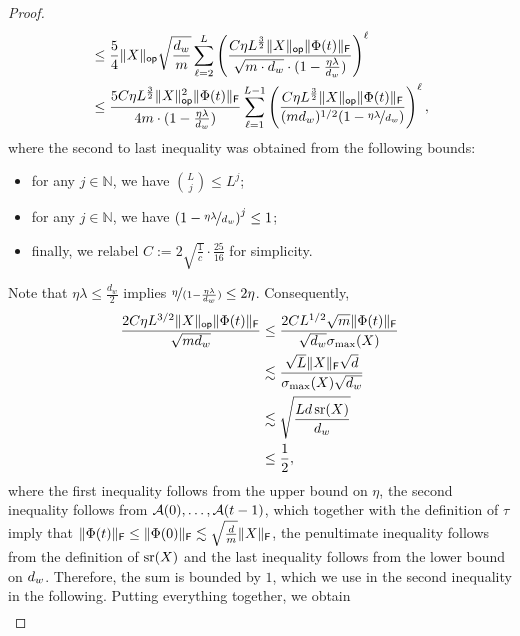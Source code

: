 \begin{proof}
\begin{align*}
                 &\leq
 \frac{5}{4} \lVert X\rVert_{\mathsf{op}}  \sqrt{\frac{d_{w}}{m}}
  \sum_{\ell=2}^{L} \left(\frac{C \eta L^{\frac{3}{2}} \lVert X\rVert_{\mathsf{op}} \lVert\Phi(t)\rVert_{\mathsf{F}}}{\sqrt{m \cdot d_w} \cdot (1 - \frac{\eta \lambda}{d_w})}\right)^{\ell} \\
                 &\leq
                 \frac{5C \eta L^{\frac{3}{2}} \lVert X\rVert_{\mathsf{op}}^2 \lVert\Phi(t)\rVert_{\mathsf{F}}}{4m \cdot (1 - \frac{\eta \lambda}{d_w})}
                 \sum_{\ell = 1}^{L - 1} \left(
                   \frac{C \eta L^{\frac{3}{2}} \lVert X\rVert_{\mathsf{op}} \lVert\Phi(t)\rVert_{\mathsf{F}}}{(m d_w)^{1/2} (1 - \nicefrac{\eta \lambda}{d_w})}
                 \right)^{\ell},
\end{align*}
where the second to last inequality was obtained  from the following bounds:
\begin{itemize}
  \item for any $j \in \mathbb{N}$, we have $\binom{L}{j} \leq L^j$;
  \item for any $j \in \mathbb{N}$, we have $\left(1 - \nicefrac{\eta \lambda}{d_w}\right)^{j} \leq 1$;
  \item finally, we relabel $C := 2 \sqrt{\frac{1}{c}} \cdot \frac{25}{16} $ for simplicity.
\end{itemize}
Note that $\eta \lambda \leq \frac{d_w}{2}$ implies $\nicefrac{\eta}{(1 - \frac{\eta \lambda}{d_w})} \leq 2\eta$. Consequently,
\begin{align*}
 \frac{2C \eta L^{3/2} \lVert X\rVert_{\mathsf{op}} \lVert\Phi(t)\rVert_{\mathsf{F}}}{\sqrt{m d_{w}}} &\leq
     \frac{2C L^{1/2} \sqrt{m} \lVert\Phi(t)\rVert_{\mathsf{F}}}{\sqrt{d_{w}} \sigma_{\max}(X)} \\ 
                                                                         &\lesssim
    \frac{\sqrt{L} \lVert X\rVert_{\mathsf{F}} \sqrt{d}}{\sigma_{\max}(X) \sqrt{d_w}} \\
     &\lesssim
 \sqrt{\frac{L d \operatorname{\mathrm{sr}}(X)}{d_w}} \\
     &\leq \frac{1}{2},
\end{align*}
where the first inequality follows from the upper bound on $\eta$, the second inequality
follows from $\mathcal{A}(0), \dots, \mathcal{A}(t-1)$, which together with the definition of $\tau$
imply that $\lVert\Phi(t)\rVert_{\mathsf{F}} \leq \lVert\Phi(0)\rVert_{\mathsf{F}} \lesssim \sqrt{\frac{d}{m}} \lVert X\rVert_{\mathsf{F}}$,
the penultimate inequality follows from the definition of $\operatorname{\mathrm{sr}}(X)$ and the last inequality follows
from the lower bound on $d_{w}$.
Therefore, the sum is bounded by $1$, which we use in the second inequality in the following.
Putting everything together, we obtain
\begin{align*}

\end{align*}
\end{proof}
